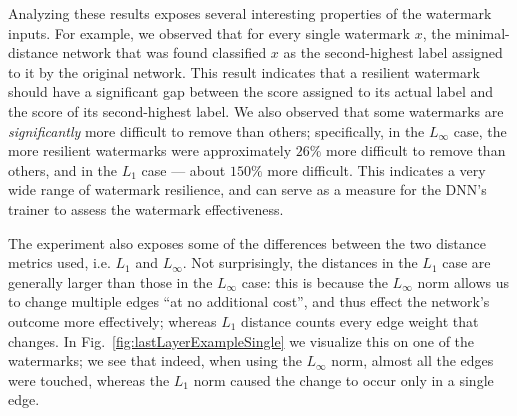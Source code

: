 \documentclass{easychair}
\newcommand{\guy}[1]{\marginpar{\textcolor{orange}{Guy: #1}}}
\begin{document}
Analyzing these results exposes several interesting properties of the
watermark inputs. For example, we observed 
that for every single watermark $x$, the minimal-distance network that
was found classified $x$ as the second-highest label assigned to
it by the original network. This result indicates
that a resilient watermark should have a
significant gap between the score assigned to its actual label and
the score of its second-highest label. We also observed that some
watermarks are \emph{significantly} more difficult to remove than
others; specifically, in the $L_\infty$ case, the more resilient
watermarks were approximately $26\%$ more difficult to remove than
others, and in the $L_1$ case --- about $150\%$ more
difficult. \guy{TODO: ben, please check these numbers with the raw
  data. Also, can you check if the hardest benchmarks had larger gaps
  between the winner and runner-up label?}
This indicates a very wide range of watermark resilience, and can
serve as a measure for the DNN's trainer to assess the watermark effectiveness.

The experiment also exposes some of the differences between the two
distance metrics used, i.e. $L_1$ and $L_\infty$. Not surprisingly,
the distances in the $L_1$ case are generally larger than those in the
$L_\infty$ case: this is because the $L_\infty$ norm allows us to
change multiple edges ``at no additional cost'', and thus effect the
network's outcome more effectively; whereas $L_1$ distance counts
every edge weight that changes. In
Fig.~\ref{fig:lastLayerExampleSingle} we visualize this on one
of the watermarks; we see that indeed, when using the $L_\infty$ norm,
almost all the edges were touched, whereas the $L_1$ norm caused the
change to occur only in a single edge.
\end{document}
